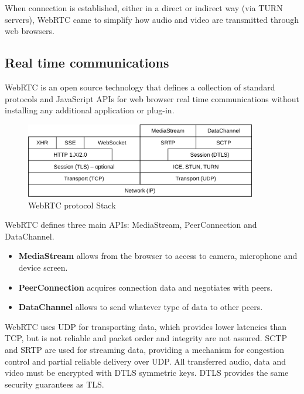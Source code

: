 When connection is established, either in a direct or indirect way (via \ac{TURN} servers), \ac{WebRTC} came to simplify how audio and video are transmitted through web browsers.

\subsection{Real time communications}\label{rtc}

\ac{WebRTC} is an open source technology that defines a collection of standard protocols and JavaScript \ac{API}s for web browser real time communications without installing any additional application or plug-in.

\begin{figure}[H]
	\centering
	\includegraphics[width=0.9\textwidth]{figures/webrtc_stack.png}
	\caption{WebRTC protocol Stack}
\end{figure}

\ac{WebRTC} defines three main \ac{API}s: MediaStream, PeerConnection and DataChannel. 

\begin{itemize}
  \item \textbf{MediaStream} allows from the browser to access to camera, microphone and device screen. 

  \item \textbf{PeerConnection} acquires connection data and negotiates with peers.

  \item \textbf{DataChannel} allows to send whatever type of data to other peers.
\end{itemize}

\ac{WebRTC} uses \ac{UDP} for transporting data, which provides lower latencies than \ac{TCP}, but is not reliable and packet order and integrity are not assured. \ac{SCTP} and \ac{SRTP} are used for streaming data, providing a mechanism for congestion control and partial reliable delivery over \ac{UDP}. All transferred audio, data and video must be encrypted with \ac{DTLS} symmetric keys. \ac{DTLS} provides the same security guarantees as \ac{TLS}. 

